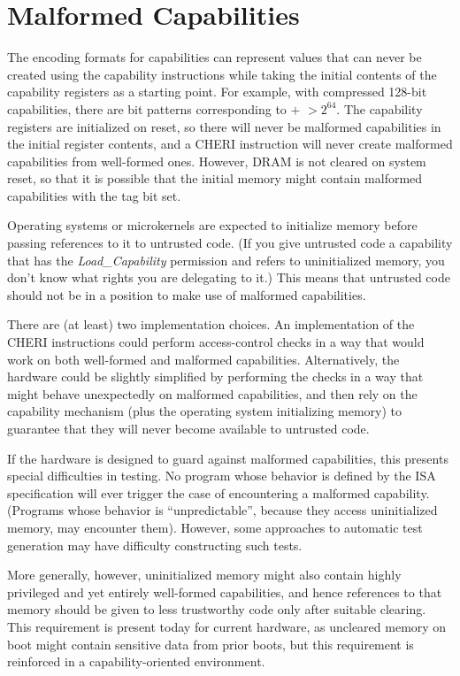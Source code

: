 \section{Malformed Capabilities}

The encoding formats for capabilities can represent values that can never be
created using the capability instructions while taking the initial contents of
the capability registers as a starting point. For example, with compressed
128-bit capabilities, there are bit patterns corresponding to \cbase{} $+$
\clength{} $> 2^{64}$.
The capability registers are initialized on reset, so there will
never be malformed capabilities in the initial register contents, and 
a CHERI instruction will never create malformed capabilities from
well-formed ones. However, DRAM is not cleared on system reset, so that it is
possible that the initial memory might contain malformed capabilities with the
tag bit set.

Operating systems or microkernels are expected to initialize memory before
passing references to it to untrusted code. (If you give untrusted code a capability that
has the \emph{Load\_Capability} permission and refers to uninitialized memory,
you don't know what rights you are delegating to it.)
This means that untrusted
code should not be in a position to make use of malformed capabilities.

There are (at least) two implementation choices. An implementation of the CHERI
instructions could perform access-control checks in a way that would
work on both well-formed and malformed capabilities.  
Alternatively, the hardware could be
slightly simplified by performing the checks in a way that might behave
unexpectedly on malformed capabilities, and then rely on the capability
mechanism (plus the operating system initializing memory) to guarantee that
they will never become available to untrusted code.

If the hardware is designed to guard against malformed capabilities, this
presents special difficulties in testing. No program whose behavior
is defined by the ISA specification will ever trigger the case of encountering
a malformed capability. (Programs whose behavior is ``unpredictable'', because
they access uninitialized memory, may encounter them). 
However, some approaches to
automatic test generation may have difficulty constructing such tests.

More generally, however, uninitialized memory might also contain highly
privileged and yet entirely well-formed capabilities, and hence references to
that memory should be given to less trustworthy code only after suitable
clearing.
This requirement is present today for current hardware, as uncleared memory on
boot might contain sensitive data from prior boots, but this requirement is
reinforced in a capability-oriented environment.

